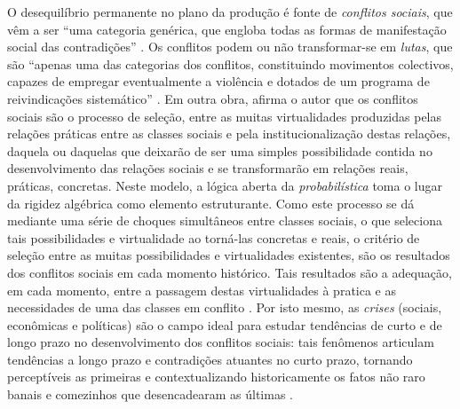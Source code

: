 O desequilíbrio permanente no plano da produção é fonte de \textit{conflitos sociais}, que vêm a ser ``uma categoria genérica, que engloba todas as formas de manifestação social das contradições'' \cite[p.~10]{BERNARDO1997}. Os conflitos podem ou não transformar-se em \textit{lutas}, que são ``apenas uma das categorias dos conflitos, constituindo movimentos colectivos, capazes de empregar eventualmente a violência e dotados de um programa de reivindicações sistemático'' \cite[p.~10]{BERNARDO1997}. Em outra obra, afirma o autor que os conflitos sociais são o processo de seleção, entre as muitas virtualidades produzidas pelas relações práticas entre as classes sociais e pela institucionalização destas relações, daquela ou daquelas que deixarão de ser uma simples possibilidade contida no desenvolvimento das relações sociais e se transformarão em relações reais, práticas, concretas. Neste modelo, a lógica aberta da \textit{probabilística} toma o lugar da rigidez algébrica como elemento estruturante. Como este processo se dá mediante uma série de choques simultâneos entre classes sociais, o que seleciona tais possibilidades e virtualidade ao torná-las concretas e reais, o critério de seleção entre as muitas possibilidades e virtualidades existentes, são os resultados dos conflitos sociais em cada momento histórico. Tais resultados são a adequação, em cada momento, entre a passagem destas virtualidades à pratica e as necessidades de uma das classes em conflito \cite[p.~31-32]{BERNARDO1991a}. Por isto mesmo, as \textit{crises} (sociais, econômicas e políticas) são o campo ideal para estudar tendências de curto e de longo prazo no desenvolvimento dos conflitos sociais: tais fenômenos articulam tendências a longo prazo e contradições atuantes no curto prazo, tornando perceptíveis as primeiras e contextualizando historicamente os fatos não raro banais e comezinhos que desencadearam as últimas \cite[p.~128]{BERNARDO1997}.


